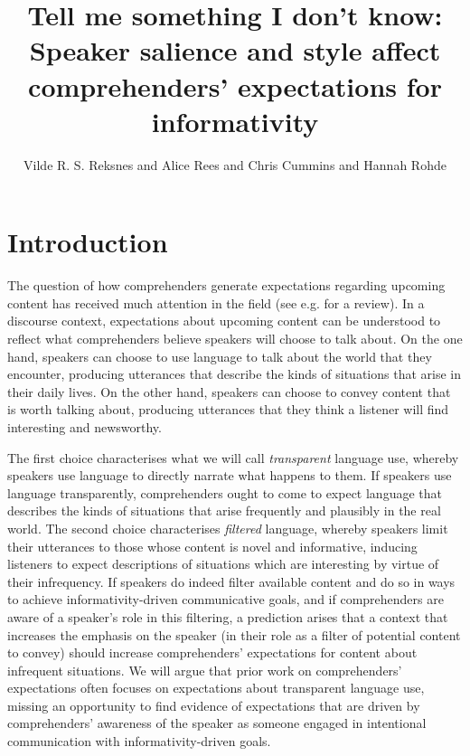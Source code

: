 \documentclass[output=paper,colorlinks,citecolor=brown]{langscibook}
\author{Vilde R. S. Reksnes\orcid{0000-0002-6329-0469}\affiliation{University of Edinburgh} and Alice Rees\orcid{0000-0001-5906-2693}\affiliation{University of Edinburgh} and Chris Cummins\orcid{0000-0001-8708-4515}\affiliation{University of Edinburgh} and Hannah Rohde\orcid{0000-0002-9356-3229}\affiliation{University of Edinburgh}}
\title[Tell me something I don’t know]{Tell me something I don’t know: Speaker salience and style affect comprehenders’ expectations for informativity}
\begin{document}
\maketitle

\section{Introduction} 
The question of how comprehenders generate expectations regarding upcoming content has received much attention in the field (see e.g. \cite{KuperbergJaeger2016} for a review). In a discourse context, expectations about upcoming content can be understood to reflect what comprehenders believe speakers will choose to talk about. On the one hand, speakers can choose to use language to talk about the world that they encounter, producing utterances that describe the kinds of situations that arise in their daily lives. On the other hand, speakers can choose to convey content that is worth talking about, producing utterances that they think a listener will find interesting and newsworthy. 

The first choice characterises what we will call \textit{transparent} language use, wher\-eby speakers use language to directly narrate what happens to them. If speakers use language transparently, comprehenders ought to come to expect language that describes the kinds of situations that arise frequently and plausibly in the real world. The second choice characterises \textit{filtered} language, whereby speakers limit their utterances to those whose content is novel and informative, inducing listeners to expect descriptions of situations which are interesting by virtue of their infrequency. If speakers do indeed filter available content and do so in ways to achieve informativity-driven communicative goals, and if comprehenders are aware of a speaker's role in this filtering, a prediction arises that a context that increases the emphasis on the speaker (in their role as a filter of potential content to convey) should increase comprehenders' expectations for content about infrequent situations. We will argue that prior work on comprehenders' expectations often focuses on expectations about transparent language use, missing an opportunity to find evidence of expectations that are driven by comprehenders' awareness of the speaker as someone engaged in intentional communication with informativity-driven goals. 
\end{document}
